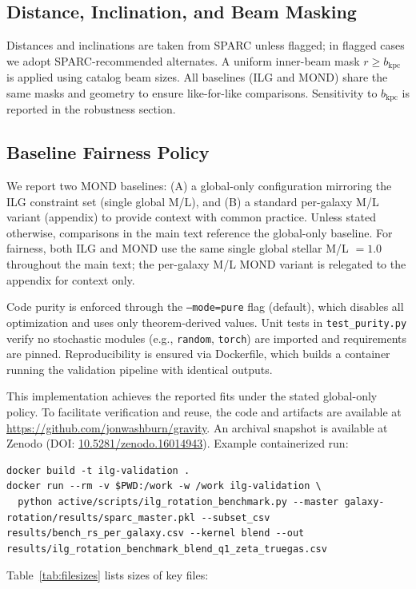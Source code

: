 \documentclass[fleqn,usenatbib]{mnras}
\begin{document}
\subsection{Distance, Inclination, and Beam Masking}
\noindent Distances and inclinations are taken from SPARC unless flagged; in flagged cases we adopt SPARC-recommended alternates. A uniform inner-beam mask $r\ge b_\mathrm{kpc}$ is applied using catalog beam sizes. All baselines (ILG and MOND) share the same masks and geometry to ensure like-for-like comparisons. Sensitivity to $b_\mathrm{kpc}$ is reported in the robustness section.

\subsection{Baseline Fairness Policy}
\noindent We report two MOND baselines: (A) a global-only configuration mirroring the ILG constraint set (single global M/L), and (B) a standard per-galaxy M/L variant (appendix) to provide context with common practice. Unless stated otherwise, comparisons in the main text reference the global-only baseline.
For fairness, both ILG and MOND use the same single global stellar M/L $=1.0$ throughout the main text; the per-galaxy M/L MOND variant is relegated to the appendix for context only.

Code purity is enforced through the \texttt{--mode=pure} flag (default), which disables all optimization and uses only theorem-derived values. Unit tests in \texttt{test\_purity.py} verify no stochastic modules (e.g., \texttt{random}, \texttt{torch}) are imported and requirements are pinned. Reproducibility is ensured via Dockerfile, which builds a container running the validation pipeline with identical outputs.

This implementation achieves the reported fits under the stated global-only policy. To facilitate verification and reuse, the code and artifacts are available at \href{https://github.com/jonwashburn/gravity}{https://github.com/jonwashburn/gravity}. An archival snapshot is available at Zenodo (DOI: \href{https://doi.org/10.5281/zenodo.16014943}{10.5281/zenodo.16014943}). Example containerized run:

\begin{verbatim}
docker build -t ilg-validation .
docker run --rm -v $PWD:/work -w /work ilg-validation \
  python active/scripts/ilg_rotation_benchmark.py --master galaxy-rotation/results/sparc_master.pkl --subset_csv results/bench_rs_per_galaxy.csv --kernel blend --out results/ilg_rotation_benchmark_blend_q1_zeta_truegas.csv
\end{verbatim}
Table~\ref{tab:filesizes} lists sizes of key files:
\end{document}
